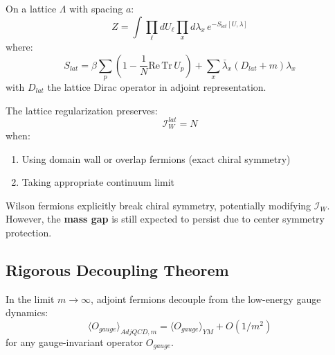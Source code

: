 \begin{definition}
\label{def:lattice-adjqcd}
On a lattice $\Lambda$ with spacing $a$:
\begin{equation}
Z = \int \prod_{\ell} dU_\ell \prod_x d\lambda_x \, e^{-S_{lat}[U,\lambda]}
\end{equation}
where:
\begin{equation}
S_{lat} = \beta \sum_p (1 - \frac{1}{N}\mathrm{Re}\,\mathrm{Tr}\, U_p) + \sum_x \bar{\lambda}_x (D_{lat} + m) \lambda_x
\end{equation}
with $D_{lat}$ the lattice Dirac operator in adjoint representation.
\end{definition}

\begin{theorem}
\label{thm:lattice-witten}
The lattice regularization preserves:
\begin{equation}
\mathcal{I}_W^{lat} = N
\end{equation}
when:
\begin{enumerate}
\item Using domain wall or overlap fermions (exact chiral symmetry)
\item Taking appropriate continuum limit
\end{enumerate}
\end{theorem}

\begin{remark}
Wilson fermions explicitly break chiral symmetry, potentially modifying 
$\mathcal{I}_W$. However, the \textbf{mass gap} is still expected to persist 
due to center symmetry protection.
\end{remark}

\subsection{Rigorous Decoupling Theorem}

\begin{theorem}
\label{thm:decoupling-rigorous}
In the limit $m \to \infty$, adjoint fermions decouple from the low-energy 
gauge dynamics:
\begin{equation}
\langle O_{gauge} \rangle_{AdjQCD,m} = \langle O_{gauge} \rangle_{YM} + O(1/m^2)
\end{equation}
for any gauge-invariant operator $O_{gauge}$.
\end{theorem}


